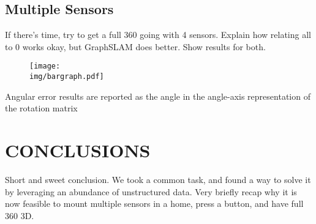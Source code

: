 \documentclass[letterpaper, 10 pt, conference]{ieeeconf}  %
\newcommand{\img}{img}
\begin{document}
\subsection{Multiple Sensors}

If there's time, try to get a full 360 going with 4 sensors. Explain how relating all to 0 works okay, but GraphSLAM does better. Show 
results for both.

\begin{figure}
  \centering
  \texttt{[image: \\img/bargraph.pdf]}
  \caption{}
  \label{fig:bargraph}
\end{figure}

\begin{figure}
  \centering
  
  \label{fig:results}
\end{figure}

Angular error results are reported as the angle in the angle-axis representation of the rotation matrix 

\section{CONCLUSIONS}

Short and sweet conclusion. We took a common task, and found a way to solve it by leveraging an abundance of unstructured 
data. Very briefly recap why it is now feasible to mount multiple sensors in a home, press a button, and have full 360 3D.



\end{document}
